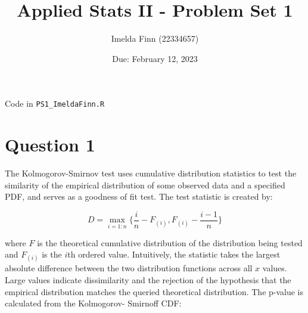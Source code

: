 \documentclass[12pt,letterpaper]{article}
\title{Applied Stats II - Problem Set 1}
\date{Due: February 12, 2023}
\author{Imelda Finn (22334657)}
\begin{document}
	\maketitle

	Code in \texttt{PS1\_ImeldaFinn.R}


\section*{Question 1}
\vspace{.25cm}
\noindent The Kolmogorov-Smirnov test uses cumulative distribution statistics to test the similarity of the empirical distribution of some observed data and a specified PDF, and serves as a goodness of fit test. The test statistic is created by:

$$D = \max_{i=1:n} \Big\{ \frac{i}{n}  - F_{(i)}, F_{(i)} - \frac{i-1}{n} \Big\}$$

\noindent where $F$ is the theoretical cumulative distribution of the distribution being tested and $F_{(i)}$ is the $i$th ordered value. Intuitively, the statistic takes the largest absolute difference between the two distribution functions across all $x$ values. Large values indicate dissimilarity and the rejection of the hypothesis that the empirical distribution matches the queried theoretical distribution. The p-value is calculated from the Kolmogorov-
Smirnoff CDF:
\end{document}
